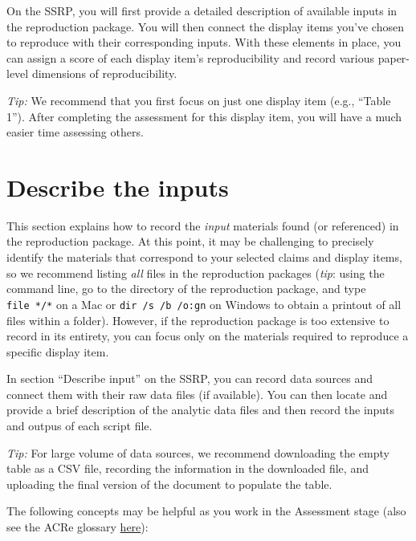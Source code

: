 \documentclass[
  openany]{book}
\begin{document}
On the SSRP, you will first provide a detailed description of available inputs in the reproduction package. You will then connect the display items you've chosen to reproduce with their corresponding inputs. With these elements in place, you can assign a score of each display item's reproducibility and record various paper-level dimensions of reproducibility.

\emph{Tip:} We recommend that you first focus on just one display item (e.g., ``Table 1''). After completing the assessment for this display item, you will have a much easier time assessing others.

\hypertarget{describe-inputs}{%
\section{Describe the inputs}\label{describe-inputs}}

This section explains how to record the \emph{input} materials found (or referenced) in the reproduction package. At this point, it may be challenging to precisely identify the materials that correspond to your selected claims and display items, so we recommend listing \emph{all} files in the reproduction packages (\emph{tip}: using the command line, go to the directory of the reproduction package, and type \texttt{file\ */*} on a Mac or \texttt{dir\ /s\ /b\ /o:gn} on Windows to obtain a printout of all files within a folder). However, if the reproduction package is too extensive to record in its entirety, you can focus only on the materials required to reproduce a specific display item.

In section ``Describe input'' on the SSRP, you can record data sources and connect them with their raw data files (if available). You can then locate and provide a brief description of the analytic data files and then record the inputs and outpus of each script file.

\emph{Tip:} For large volume of data sources, we recommend downloading the empty table as a CSV file, recording the information in the downloaded file, and uploading the final version of the document to populate the table.

The following concepts may be helpful as you work in the Assessment stage (also see the ACRe glossary \protect\hyperlink{definitions}{here}):
\end{document}
